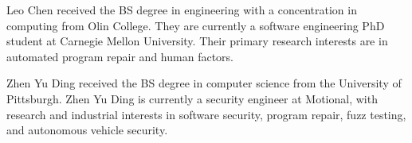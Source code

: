 \documentclass[10pt,journal,compsoc]{IEEEtran}
\begin{document}
\ifCLASSOPTIONcaptionsoff
  \newpage
\fi







% 
\begin{IEEEbiography}{Leo Chen}
    received the BS degree in engineering with a concentration in computing from Olin College.
    They are currently a software engineering PhD student at Carnegie Mellon University.
    Their primary research interests are in automated program repair and human factors.
    
\end{IEEEbiography}


\begin{IEEEbiography}{Zhen Yu Ding}
    received the BS degree in computer science from the University of Pittsburgh.
    Zhen Yu Ding is currently a security engineer at Motional, with research and
    industrial interests in software security, program repair, fuzz testing, and
    autonomous vehicle security.
\end{IEEEbiography}
\end{document}
